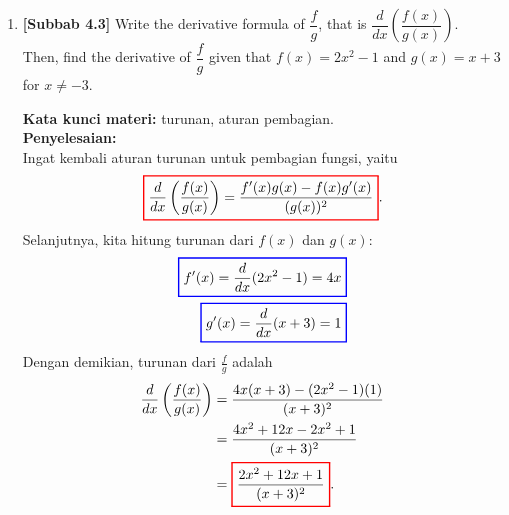 \documentclass[10pt,openany,a4paper]{article}
\theoremstyle{definition}
\theoremstyle{definition}
\theoremstyle{plain}
\newenvironment{jawab}[2][tes]{%
\par\noindent\textbf{Kata kunci materi:} #1.\\
\textbf{Penyelesaian:} #2%
}{}
\begin{document}
\begin{enumerate}
    \item \textbf{[Subbab 4.3]} Write the derivative formula of $\dfrac{f}{g}$, that is $\dfrac{d}{dx}\left(\dfrac{f(x)}{g(x)}\right)$.\\
    Then, find the derivative of $\dfrac{f}{g}$ given that $f(x)=2x^2-1$ and $g(x)=x+3$ for $x\neq -3$.
    \begin{jawab}[turunan, aturan pembagian]{~\\
        Ingat kembali aturan turunan untuk pembagian fungsi, yaitu
        \[
        \colorlet{oldcolor}{.}
        \color{red}
        \setlength{\fboxrule}{1pt} \boxed{\color{oldcolor}\frac{d}{dx}\left(\frac{f(x)}{g(x)}\right) = \frac{f'(x)g(x) - f(x)g'(x)}{(g(x))^2}}\color{oldcolor}.
        \]
        Selanjutnya, kita hitung turunan dari \(f(x)\) dan \(g(x)\):
        \begin{align*}
            \colorlet{oldcolor}{.}
        \color{blue}
        \setlength{\fboxrule}{1pt} \boxed{\color{oldcolor}f'(x) = \frac{d}{dx}(2x^2-1) = 4x}\color{oldcolor}\\
            \colorlet{oldcolor}{.}
        \color{blue}
        \setlength{\fboxrule}{1pt} \boxed{\color{oldcolor}g'(x) = \frac{d}{dx}(x+3) = 1}\color{oldcolor}
        \end{align*}
        Dengan demikian, turunan dari \(\frac{f}{g}\) adalah
        \begin{align*}
            \frac{d}{dx}\left(\frac{f(x)}{g(x)}\right) &= \frac{4x(x+3)-(2x^2-1)(1)}{(x+3)^2}\\
            &= \frac{4x^2+12x-2x^2+1}{(x+3)^2}\\
            &= \colorlet{oldcolor}{.}
        \color{red}
        \setlength{\fboxrule}{1pt} \boxed{\color{oldcolor}\frac{2x^2+12x+1}{(x+3)^2}}\color{oldcolor}.
        \end{align*}
    }
    \end{jawab}

\end{enumerate}

\newpage
\end{document}
